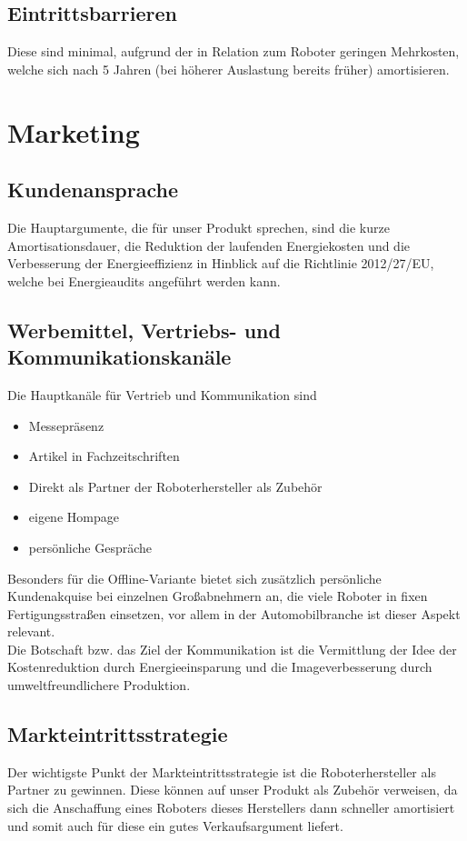 \section{Eintrittsbarrieren}
Diese sind minimal, aufgrund der in Relation zum Roboter geringen Mehrkosten, welche sich nach 5 Jahren (bei höherer Auslastung bereits früher) amortisieren.

\chapter{Marketing}

\section{Kundenansprache}
Die Hauptargumente, die für unser Produkt sprechen, sind die kurze Amortisationsdauer, die Reduktion der laufenden Energiekosten und die Verbesserung der Energieeffizienz in Hinblick auf die Richtlinie 2012/27/EU, welche bei Energieaudits angeführt werden kann.

\section{Werbemittel, Vertriebs- und Kommunikationskanäle}
Die Hauptkanäle für Vertrieb und Kommunikation sind
\begin{itemize}
\item Messepräsenz
\item Artikel in Fachzeitschriften
\item Direkt als Partner der Roboterhersteller als Zubehör
\item eigene Hompage
\item persönliche Gespräche
\end{itemize}
Besonders für die Offline-Variante bietet sich zusätzlich persönliche Kundenakquise bei einzelnen Großabnehmern an, die viele Roboter in fixen Fertigungsstraßen einsetzen, vor allem in der Automobilbranche ist dieser Aspekt relevant.\\
Die Botschaft bzw. das Ziel der Kommunikation ist die Vermittlung der Idee der Kostenreduktion durch Energieeinsparung und die Imageverbesserung durch umweltfreundlichere Produktion.

\section{Markteintrittsstrategie}
Der wichtigste Punkt der Markteintrittsstrategie ist die Roboterhersteller als Partner zu gewinnen. Diese können auf unser Produkt als Zubehör verweisen, da sich die Anschaffung eines Roboters dieses Herstellers dann schneller amortisiert und somit auch für diese ein gutes Verkaufsargument liefert.
